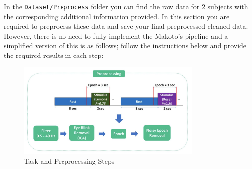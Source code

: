 \documentclass[12pt]{article}
\begin{document}
In the \texttt{Dataset/Preprocess} folder you can find the raw data for 2 subjects with the corresponding additional information provided. In this section you are required to preprocess these data and save your final preprocessed cleaned data.\\
However, there is no need to fully implement the Makoto's pipeline and a simplified version of this is as follows; follow the instructions below and provide the required results in each step:\\
\begin{figure}[h]
	\center \includegraphics[scale=1,width=0.8\textwidth]{Images/Preprocess.png}
	\caption{Task and Preprocessing Steps \cite{olfactory-deficit-AD}}
	\label{fig:fig3}
\end{figure}
\end{document}
